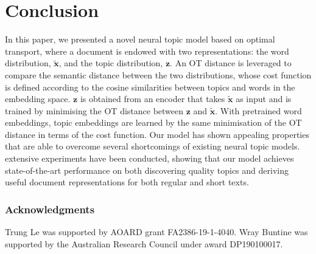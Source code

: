 \documentclass{article}
\renewcommand{\vec}{\boldsymbol}
\begin{document}
\section{Conclusion}
In this paper, we presented a novel neural topic model based on optimal transport, where a document is endowed with two representations: the word distribution, $\tilde{\vec{x}}$, and the topic distribution, $\vec{z}$. An OT distance is leveraged to compare the semantic distance between the two distributions, whose cost function is defined according to the cosine similarities between topics and words in the embedding space.
$\vec{z}$ is obtained from an encoder that takes $\tilde{\vec{x}}$ as input and is trained by minimising the OT distance between $\vec{z}$ and $\tilde{\vec{x}}$.
With pretrained word embeddings, topic embeddings are learned by the same minimisation of the OT distance in terms of the cost function. Our model has shown appealing properties that are able to overcome several shortcomings of existing neural topic models.
extensive experiments have been conducted, showing that our model achieves state-of-the-art performance on both discovering quality topics and deriving useful document representations  for both regular and short texts. 

\subsubsection*{Acknowledgments}
Trung Le was supported by AOARD grant FA2386-19-1-4040.
Wray Buntine was supported by the Australian Research Council under award DP190100017.




\newpage
\appendix
{}
\end{document}
